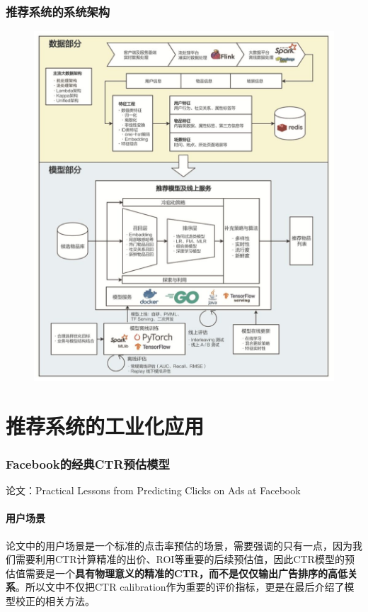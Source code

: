 \documentclass[12pt]{article}
\begin{document}
\section{推荐系统的系统架构}
\begin{figure}[H]
    \centering
    \includegraphics[width=1\textwidth]{fig/Deep_Learning_Refenrence_System_Architecture.jpg}
\end{figure}


\part{推荐系统的工业化应用}
\section{Facebook的经典CTR预估模型}
论文：Practical Lessons from Predicting Clicks on Ads at Facebook

\subsection{用户场景}
论文中的用户场景是一个标准的点击率预估的场景，需要强调的只有一点，因为我们需要利用CTR计算精准的出价、ROI等重要的后续预估值，因此CTR模型的预估值需要是一个\textbf{具有物理意义的精准的CTR，而不是仅仅输出广告排序的高低关系}。所以文中不仅把CTR calibration作为重要的评价指标，更是在最后介绍了模型校正的相关方法。
\end{document}
